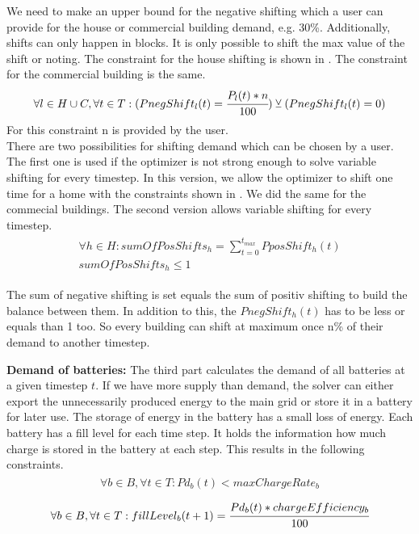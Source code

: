We need to make an upper bound for the negative shifting which a user can provide for the house or commercial building demand, e.g. 30\%. Additionally, shifts can only happen in blocks. It is only possible to shift the max value of the shift or noting. 
The constraint for the house shifting is shown in .
The constraint for the commercial building is the same.
\begin{align} \label{eq:shiftingUpperBound}
\begin{split}
\forall l \in H\cup C, \forall t \in T: (PnegShift_l(t) = \cfrac{P_{l}(t) * n}{100}) \veebar (PnegShift_{l}(t) = 0)
\end{split}
\end{align}
For this constraint n is provided by the user.\\
There are two possibilities for shifting demand which can be chosen by a user.
The first one is used if the optimizer is not strong enough to solve variable shifting for every timestep.
In this version, we allow the optimizer to shift one time for a home with the constraints shown in .
We did the same for the commecial buildings.
The second version allows variable shifting for every timestep.
\begin{align} \label{eq:numberOfShifts}
\begin{split}
\forall h \in H: sumOfPosShifts_{h} = \sum\limits_{t = 0}^{t_{max}} PposShift_h(t)\\
sumOfPosShifts_{h} \leq 1
\end{split}
\end{align}

The sum of negative shifting is set equals the sum of positiv shifting to build the balance between them.
In addition to this, the $PnegShift_h(t)$ has to be less or equals than 1 too.
So every building can shift at maximum once  n\% of their demand to another timestep.

\textbf{Demand of batteries:}
The third part calculates the demand of all batteries at a given timestep $t$.
If we have more supply than demand, the solver can either export the unnecessarily produced energy to the main grid or store it in a battery for later use.
The storage of energy in the battery has a small loss of energy. Each battery has a fill level for each time step. It holds the information how much charge is stored in the battery at each step. This results in the following constraints.
\begin{align} \label{eq:limitCharge}
\begin{split}
\forall b \in B, \forall t \in T: Pd_{b}(t) < maxChargeRate_{b}
\end{split}
\end{align}
\begin{align} \label{eq:effi}
\begin{split}
\forall b \in B, \forall t \in T: fillLevel_{b}(t+1) = \cfrac{Pd_{b}(t)*chargeEfficiency_b}{100}
\end{split}
\end{align}

